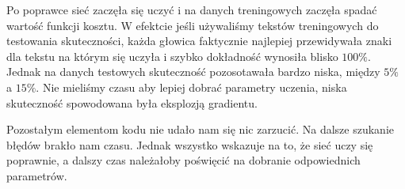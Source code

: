 Po poprawce sieć zaczęła się uczyć i na danych treningowych zaczęła spadać wartość funkcji kosztu. W efektcie jeśli
używaliśmy tekstów treningowych do testowania skuteczności, każda głowica faktycznie najlepiej przewidywała
znaki dla tekstu na którym się uczyła i szybko dokładność wynosiła blisko $100\%$. Jednak na danych testowych
skuteczność pozosotawała bardzo niska, między $5\%$ a $15\%$. Nie mieliśmy czasu aby lepiej dobrać parametry uczenia,
niska skuteczność spowodowana była eksplozją gradientu.

Pozostałym elementom kodu nie udało nam się nic zarzucić. Na dalsze szukanie błędów brakło nam czasu.
Jednak wszystko wskazuje na to, że sieć uczy się poprawnie, a dalszy czas należałoby poświęcić na dobranie odpowiednich
parametrów.
